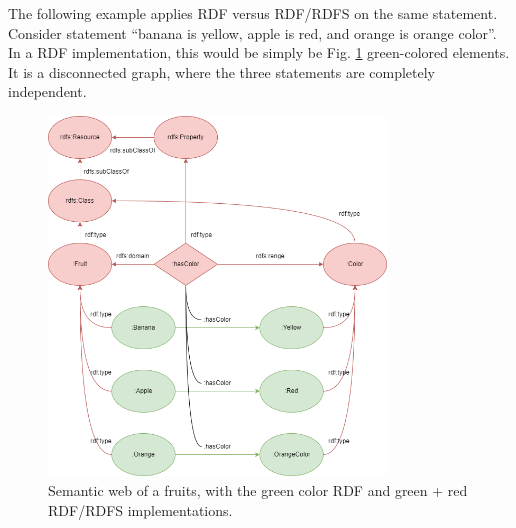 The following example applies RDF versus RDF/RDFS on the same statement. Consider statement ``banana is yellow, apple is red, and orange is orange color''. In a RDF implementation, this would be simply be Fig. \ref{fig:fruitexp} green-colored elements. It is a disconnected graph, where the three statements are completely independent.
\begin{figure}[htbp]
	\centering
	\includegraphics[width=0.8\textwidth]{./chapters/ch-semanticwebarchitecture/figures/fruitexp.png}
	\caption{Semantic web of a fruits, with the green color RDF and green + red RDF/RDFS implementations.}
	\label{fig:fruitexp}
\end{figure}

